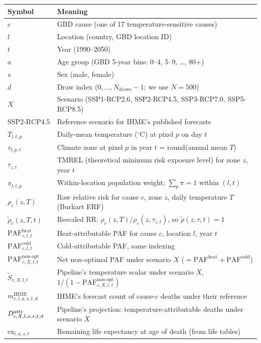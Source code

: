 \documentclass[11pt]{article}
\newcommand{\PAF}{\text{PAF}}
\newcommand{\SSPtwo}{\text{SSP2{-}RCP4.5}}
\newcommand{\mIHME}{m^{\text{IHME}}}
\begin{document}
\renewcommand{\arraystretch}{1.15}
\begin{center}
\begin{tabular}{l l}
\toprule
Symbol & Meaning \\
\midrule
$c$ & GBD cause (one of 17 temperature-sensitive causes) \\
$l$ & Location (country, GBD location ID) \\
$t$ & Year (1990--2050) \\
$a$ & Age group (GBD 5-year bins: 0--4, 5--9, \ldots, 80+) \\
$s$ & Sex (male, female) \\
$d$ & Draw index ($0, \ldots, N_{\text{draws}}-1$; we use $N=500$) \\
$X$ & Scenario (SSP1-RCP2.6, SSP2-RCP4.5, SSP3-RCP7.0, SSP5-RCP8.5) \\
$\SSPtwo$ & Reference scenario for IHME's published forecasts \\
\midrule
$T_{l,t,p}$ & Daily-mean temperature ($^{\circ}$C) at pixel $p$ on day $t$ \\
$z_{l,p,t}$ & Climate zone at pixel $p$ in year $t$ = round(annual mean $T$) \\
$\tau_{z,t}$ & TMREL (theoretical minimum risk exposure level) for zone
$z$, year $t$ \\
$\pi_{l,t,p}$ & Within-location population weight; $\sum_{p} \pi = 1$
within $(l, t)$ \\
\midrule
$\rho_c(z, T)$ & Raw relative risk for cause $c$, zone $z$, daily
temperature $T$ (Burkart ERF) \\
$\tilde\rho_c(z, T, t)$ & Rescaled RR: $\rho_c(z, T) /
\rho_c(z, \tau_{z,t})$, so $\tilde\rho(z, \tau, t) = 1$ \\
$\PAF^{\text{heat}}_{c,l,t}$ & Heat-attributable PAF for cause $c$,
location $l$, year $t$ \\
$\PAF^{\text{cold}}_{c,l,t}$ & Cold-attributable PAF, same indexing \\
$\PAF^{\text{non-opt}}_{c,X,l,t}$ & Net non-optimal PAF under scenario
$X$ ($= \PAF^{\text{heat}} + \PAF^{\text{cold}}$) \\
$\tilde S_{c,X,l,t}$ & Pipeline's temperature scalar under scenario $X$,
$1 / (1 - \PAF^{\text{non-opt}}_{c,X,l,t})$ \\
\midrule
$\mIHME_{c,l,a,s,t,d}$ & IHME's forecast count of cause-$c$ deaths under
their reference \\
$\mAttr_{c,X,l,a,s,t,d}$ & Pipeline's projection: temperature-attributable
deaths under scenario $X$ \\
$\text{ex}_{l,a,s,t}$ & Remaining life expectancy at age of death (from
life tables) \\
\bottomrule
\end{tabular}
\end{center}
\end{document}
